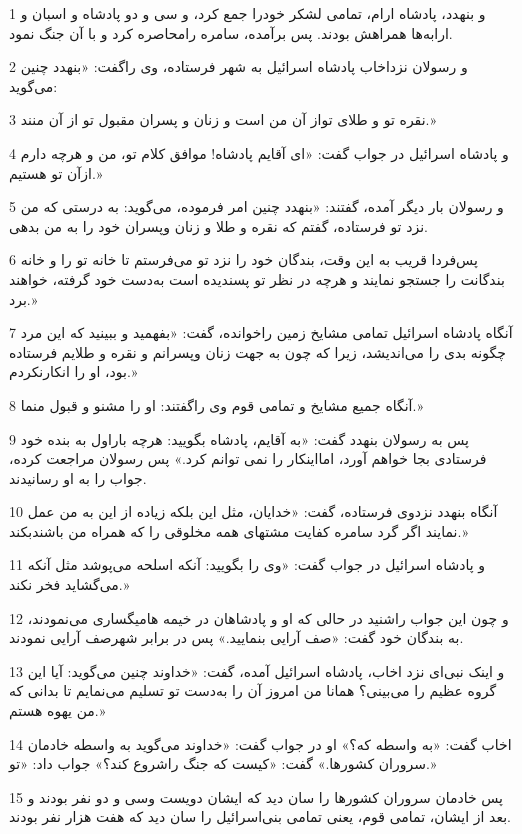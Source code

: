 \par 1 و بنهدد، پادشاه ارام، تمامی لشکر خودرا جمع کرد، و سی و دو پادشاه و اسبان و ارابه‌ها همراهش بودند. پس برآمده، سامره رامحاصره کرد و با آن جنگ نمود.
\par 2 و رسولان نزداخاب پادشاه اسرائیل به شهر فرستاده، وی راگفت: «بنهدد چنین می‌گوید:
\par 3 نقره تو و طلای تواز آن من است و زنان و پسران مقبول تو از آن منند.»
\par 4 و پادشاه اسرائیل در جواب گفت: «ای آقایم پادشاه! موافق کلام تو، من و هر‌چه دارم ازآن تو هستیم.»
\par 5 و رسولان بار دیگر آمده، گفتند: «بنهدد چنین امر فرموده، می‌گوید: به درستی که من نزد تو فرستاده، گفتم که نقره و طلا و زنان وپسران خود را به من بدهی.
\par 6 پس‌فردا قریب به این وقت، بندگان خود را نزد تو می‌فرستم تا خانه تو را و خانه بندگانت را جستجو نمایند و هر‌چه در نظر تو پسندیده است به‌دست خود گرفته، خواهند برد.»
\par 7 آنگاه پادشاه اسرائیل تمامی مشایخ زمین راخوانده، گفت: «بفهمید و ببینید که این مرد چگونه بدی را می‌اندیشد، زیرا که چون به جهت زنان وپسرانم و نقره و طلایم فرستاده بود، او را انکارنکردم.»
\par 8 آنگاه جمیع مشایخ و تمامی قوم وی راگفتند: او را مشنو و قبول منما.»
\par 9 پس به رسولان بنهدد گفت: «به آقایم، پادشاه بگویید: هر‌چه باراول به بنده خود فرستادی بجا خواهم آورد، امااینکار را نمی توانم کرد.» پس رسولان مراجعت کرده، جواب را به او رسانیدند.
\par 10 آنگاه بنهدد نزدوی فرستاده، گفت: «خدایان، مثل این بلکه زیاده از این به من عمل نمایند اگر گرد سامره کفایت مشتهای همه مخلوقی را که همراه من باشندبکند.»
\par 11 و پادشاه اسرائیل در جواب گفت: «وی را بگویید: آنکه اسلحه می‌پوشد مثل آنکه می‌گشاید فخر نکند.»
\par 12 و چون این جواب راشنید در حالی که او و پادشاهان در خیمه هامیگساری می‌نمودند، به بندگان خود گفت: «صف آرایی بنمایید.» پس در برابر شهرصف آرایی نمودند.
\par 13 و اینک نبی‌ای نزد اخاب، پادشاه اسرائیل آمده، گفت: «خداوند چنین می‌گوید: آیا این گروه عظیم را می‌بینی؟ همانا من امروز آن را به‌دست تو تسلیم می‌نمایم تا بدانی که من یهوه هستم.»
\par 14 اخاب گفت: «به واسطه که؟» او در جواب گفت: «خداوند می‌گوید به واسطه خادمان سروران کشورها.» گفت: «کیست که جنگ راشروع کند؟» جواب داد: «تو.»
\par 15 پس خادمان سروران کشورها را سان دید که ایشان دویست وسی و دو نفر بودند و بعد از ایشان، تمامی قوم، یعنی تمامی بنی‌اسرائیل را سان دید که هفت هزار نفر بودند.
